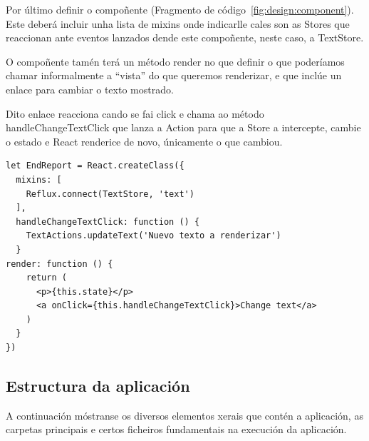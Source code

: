     Por último definir o compoñente (Fragmento de 
código~\ref{fig:design:component}). Este deberá incluir unha lista de mixins 
onde indicarlle cales son as Stores que reaccionan ante eventos lanzados 
dende este compoñente, neste caso, a TextStore.

    O compoñente tamén terá un método render no que definir o que poderíamos 
chamar informalmente a ``vista'' do que queremos renderizar, e que inclúe un 
enlace para cambiar o texto mostrado.

    Dito enlace reacciona cando se fai click e chama ao método 
handleChangeTextClick que lanza a Action para que a Store a intercepte, cambie 
o estado e React renderice de novo, únicamente o que cambiou.

    \lstset{}
     \begin{lstlisting}[caption=Exemplo de compoñente de React., 
label=fig:design:component]
let EndReport = React.createClass({
  mixins: [
    Reflux.connect(TextStore, 'text')
  ],
  handleChangeTextClick: function () {
    TextActions.updateText('Nuevo texto a renderizar')
  }
render: function () {
    return (
      <p>{this.state}</p>
      <a onClick={this.handleChangeTextClick}>Change text</a>
    )
  }
})
    \end{lstlisting}


    \subsection{Estructura da aplicación}

    A continuación móstranse os diversos elementos xerais que contén a 
aplicación, as carpetas principais e certos ficheiros fundamentais na execución 
da aplicación.

